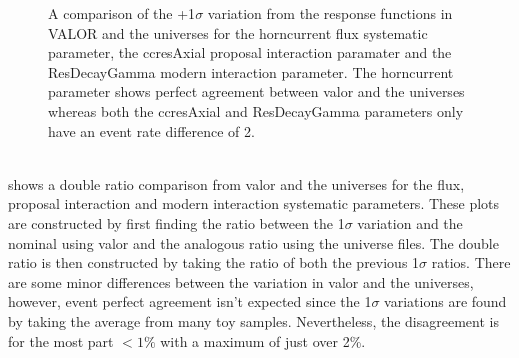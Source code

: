 \begin{figure}[h!]
  \captionsetup{width=0.49\textwidth}
  \parbox[b]{0.49\textwidth}%
  {
   \caption[+1$\sigma$ variation comparison for the horncurrent\_FluxUnisim, genie\_ccresAxial and genie\_ResDecayGamma parameters.]{A comparison of the +1$\sigma$ variation from the response functions in VALOR and the universes for the horncurrent flux systematic parameter, the ccresAxial proposal interaction paramater and the ResDecayGamma modern interaction parameter. The horncurrent parameter shows perfect agreement between \gls{valor} and the universes whereas both the ccresAxial and ResDecayGamma parameters only have an event rate difference of 2. \\\phantom{.}\\
   \label{fig:+1sigma_variations}}
   }
\end{figure}

 shows a double ratio comparison from \gls{valor} and the universes for the flux, proposal interaction and modern interaction systematic parameters. These plots are constructed by first finding the ratio between the 1$\sigma$ variation and the nominal using \gls{valor} and the analogous ratio using the universe files. The double ratio is then constructed by taking the ratio of both the previous 1$\sigma$ ratios. There are some minor differences between the variation in \gls{valor} and the universes, however, event perfect agreement isn't expected since the 1$\sigma$ variations are found by taking the average from many toy samples. Nevertheless, the disagreement is for the most part $< 1\%$ with a maximum of just over 2\%. 



